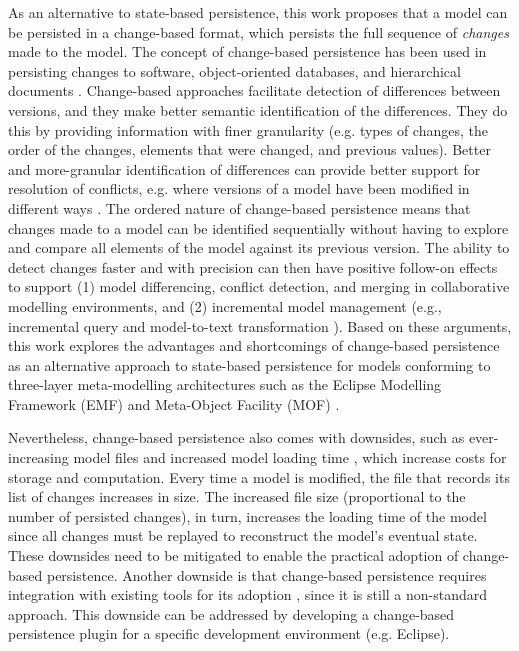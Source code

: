 As an alternative to state-based persistence, this work proposes that a model can be persisted in a change-based format, which persists the full sequence of \emph{changes} made to the model.
The concept of change-based persistence has been used in persisting changes to software, object-oriented databases, and hierarchical documents \cite{DBLP:journals/entcs/RobbesL07,DBLP:conf/sde/LippeO92,DBLP:conf/caise/IgnatN05}. Change-based approaches facilitate detection of differences between versions, and they make better semantic identification of the differences. They do this by providing information with finer granularity (e.g. types of changes, the order of the changes, elements that were changed, and previous values). Better and more-granular identification of differences can provide better support for resolution of conflicts, e.g. where versions of a model have been modified in different ways \cite{mens2002state}.
The ordered nature of change-based persistence means that changes made to a model can be identified sequentially without having to explore and compare all elements of the model against its previous version. The ability to detect changes faster and with precision can then have positive follow-on effects to support (1) model differencing, conflict detection, and merging in collaborative modelling environments, and (2) incremental model management (e.g., incremental query \cite{DBLP:conf/ecmdafa/RathHV12} and model-to-text transformation \cite{DBLP:conf/ecmdafa/OgunyomiRK15}). Based on these arguments, this work explores the advantages and shortcomings of change-based persistence as an alternative approach to state-based persistence for models conforming to three-layer meta-modelling architectures such as the Eclipse Modelling Framework (EMF) \cite{eclipse2019emf} and Meta-Object Facility (MOF) \cite{omg2018mof}.

Nevertheless, change-based persistence also comes with downsides, such as ever-increasing model files \cite{DBLP:journals/entcs/RobbesL07,DBLP:conf/edoc/KoegelHLHD10} and increased model loading time \cite{mens2002state}, which increase costs for storage and computation. Every time a model is modified, the file that records its list of changes increases in size. The increased file size (proportional to the number of persisted changes), in turn, increases the loading time of the model since all changes must be replayed to reconstruct the model’s eventual state. These downsides need to be mitigated to enable the practical adoption of change-based persistence. Another downside is that change-based persistence requires integration with existing tools for its adoption \cite{koegel2010emfstore}, since it is still a non-standard approach. This downside can be addressed by developing a change-based persistence plugin for a specific development environment (e.g. Eclipse).

